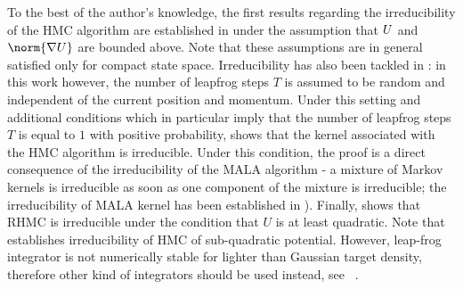 To the best of the author's knowledge, the first results regarding the
irreducibility of the HMC algorithm are established in
\cite{cances:legoll:stoltz} under the assumption that $U$ and
$\norm{\nabla \U}$ are bounded above. Note that these assumptions are
in general satisfied only for compact state space. Irreducibility has
also been tackled in
\cite{livingstone:betancourt:byrne:girolami:2016}: in this work
however, the number of leapfrog steps $T$ is assumed to be random and
independent of the current position and momentum. Under this setting
and additional conditions which in particular imply that the number of
leapfrog steps $T$ is equal to $1$ with positive probability,
\cite{livingstone:betancourt:byrne:girolami:2016} shows that the
kernel associated with the HMC algorithm is irreducible. Under this condition,
the proof is  a direct
consequence of the irreducibility of the MALA algorithm - a mixture of
Markov kernels is irreducible as soon as one component of the mixture
is irreducible; the irreducibility of MALA kernel has been established
in \cite{roberts:tweedie:1996}). Finally, \cite[Proposition
3.7]{bou:sanz:2017} shows that RHMC is irreducible under the condition
that $U$ is at least quadratic.  Note that 
establishes irreducibility of HMC of sub-quadratic potential. However,
leap-frog integrator is not numerically stable for lighter than
Gaussian target density, therefore other kind of integrators should be
used instead, see \eg~\cite[Chapter VI]{hairer:wanner:lubish:2002}. %

